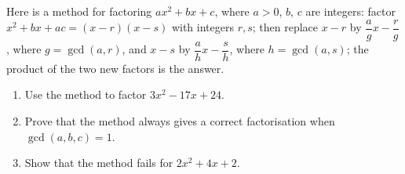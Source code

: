 Here is a method for factoring $ax^2+bx+c$, where $a>0$, $b$, $c$ are integers: factor $x^2+bx+ac=(x-r)(x-s)$ with integers $r,s$; then replace $x-r$ by $\dfrac agx-\dfrac rg$, where $g=\gcd(a,r)$, and $x-s$ by $\dfrac ahx-\dfrac sh$, where $h=\gcd(a,s)$; the product of the two new factors is the answer.
\begin{enumerate}
\item[(a)] Use the method to factor $3x^2-17x+24$.
\item[(b)] Prove that the method always gives a correct factorisation when $\gcd(a,b,c)=1$.
\item[(c)] Show that the method fails for $2x^2+4x+2$.
\end{enumerate}
